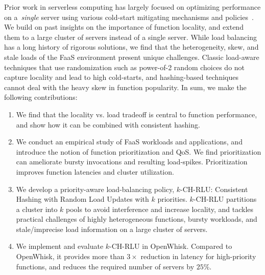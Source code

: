 Prior work in serverless computing has largely focused on optimizing performance on a~\emph{single} server using various cold-start mitigating mechanisms and policies~\cite{vhive-asplos21,faascache-asplos21}. 
We build on past insights on the importance of function locality, and extend them to a large cluster of servers instead of a single server. 
While load balancing has a long history of rigorous solutions, we find that the heterogeneity, skew, and stale loads of the FaaS environment present unique challenges. 
Classic load-aware techniques that use randomization such as power-of-2 random choices do not capture locality and lead to high cold-starts, and hashing-based techniques cannot deal with the heavy skew in function popularity.
%
In sum, we make the following contributions:
\begin{enumerate}
\item We find that the locality vs. load tradeoff is central to function performance, and show how it can be combined with consistent hashing.
\item We conduct an empirical study of FaaS workloads and applications, and introduce the notion of function prioritization and QoS. We find prioritization can ameliorate bursty invocations and resulting load-spikes. Prioritization improves function latencies and cluster utilization. 
\item We develop a priority-aware load-balancing policy, $k$-CH-RLU: Consistent Hashing with Random Load Updates with $k$ priorities.
  $k$-CH-RLU partitions a cluster into $k$ pools to avoid interference and increase locality, and tackles practical challenges of highly heterogeneous functions, bursty workloads, and stale/imprecise load information on a large cluster of servers. 
\item We implement and evaluate $k$-CH-RLU in OpenWhisk. Compared to OpenWhisk, it provides more than $3\times$ reduction in latency for high-priority functions, and reduces the required number of servers by $25\%$. 

\end{enumerate}

